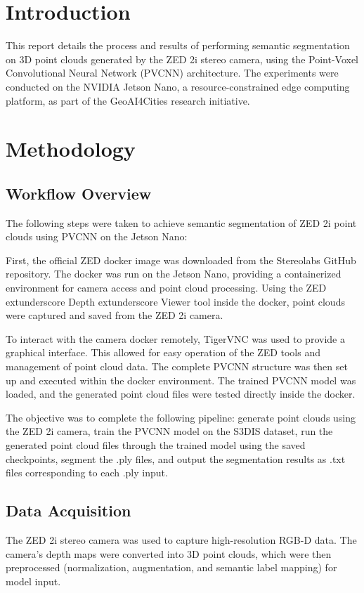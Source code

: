 \documentclass[12pt,a4paper]{report}
\begin{document}

\chapter{Introduction}
This report details the process and results of performing semantic segmentation on 3D point clouds generated by the ZED 2i stereo camera, using the Point-Voxel Convolutional Neural Network (PVCNN) architecture. The experiments were conducted on the NVIDIA Jetson Nano, a resource-constrained edge computing platform, as part of the GeoAI4Cities research initiative.

\chapter{Methodology}
\section{Workflow Overview}
The following steps were taken to achieve semantic segmentation of ZED 2i point clouds using PVCNN on the Jetson Nano:

First, the official ZED docker image was downloaded from the Stereolabs GitHub repository. The docker was run on the Jetson Nano, providing a containerized environment for camera access and point cloud processing. Using the ZED	extunderscore Depth	extunderscore Viewer tool inside the docker, point clouds were captured and saved from the ZED 2i camera.

To interact with the camera docker remotely, TigerVNC was used to provide a graphical interface. This allowed for easy operation of the ZED tools and management of point cloud data. The complete PVCNN structure was then set up and executed within the docker environment. The trained PVCNN model was loaded, and the generated point cloud files were tested directly inside the docker.

The objective was to complete the following pipeline: generate point clouds using the ZED 2i camera, train the PVCNN model on the S3DIS dataset, run the generated point cloud files through the trained model using the saved checkpoints, segment the .ply files, and output the segmentation results as .txt files corresponding to each .ply input.

\section{Data Acquisition}
The ZED 2i stereo camera was used to capture high-resolution RGB-D data. The camera’s depth maps were converted into 3D point clouds, which were then preprocessed (normalization, augmentation, and semantic label mapping) for model input.
\end{document}
